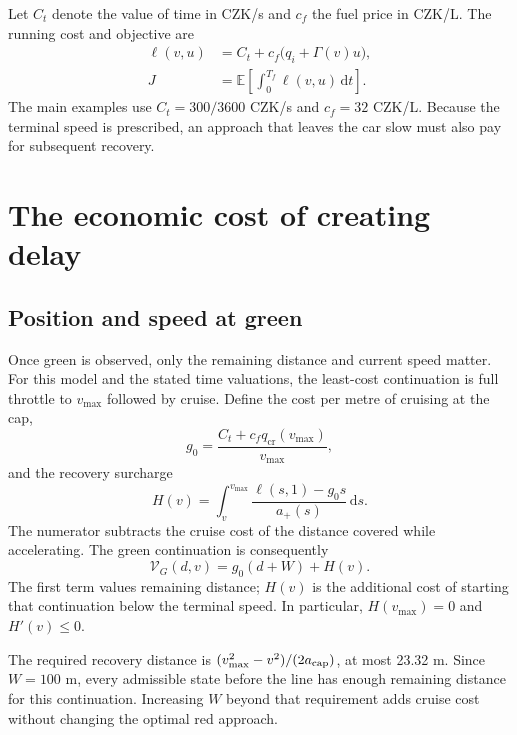 \documentclass[journal,a4paper,twocolumn]{IEEEtran}
\newcommand{\dd}{\,\mathrm{d}}
\newcommand{\cruise}{\mathrm{cr}}
\begin{document}
Let $C_t$ denote the value of time in CZK/s and $c_f$ the fuel price in CZK/L. The running cost and objective are
\begin{align}
 \ell(v,u)&=C_t+c_f\bigl(q_i+\Gamma(v)u\bigr),\label{eq:ell}\\
 J&=\mathbb E\!\left[\int_0^{T_f}\ell(v,u)\dd t\right].
 \label{eq:objective}
\end{align}
The main examples use $C_t=300/3600$ CZK/s and $c_f=32$ CZK/L. Because the terminal speed is prescribed, an approach that leaves the car slow must also pay for subsequent recovery.

\section{The economic cost of creating delay}\label{sec:cost}
\subsection{Position and speed at green}
Once green is observed, only the remaining distance and current speed matter. For this model and the stated time valuations, the least-cost continuation is full throttle to $v_{\max}$ followed by cruise. Define the cost per metre of cruising at the cap,
\begin{equation}
 g_0=\frac{C_t+c_fq_{\cruise}(v_{\max})}{v_{\max}},
\end{equation}
and the recovery surcharge
\begin{equation}
 H(v)=\int_v^{v_{\max}}
 \frac{\ell(s,1)-g_0s}{a_+(s)}\dd s.
 \label{eq:H}
\end{equation}
The numerator subtracts the cruise cost of the distance covered while accelerating. The green continuation is consequently
\begin{equation}
 \boxed{\mathcal V_G(d,v)=g_0(d+W)+H(v).}
 \label{eq:VG}
\end{equation}
The first term values remaining distance; $H(v)$ is the additional cost of starting that continuation below the terminal speed. In particular, $H(v_{\max})=0$ and $H'(v)\le0$.

The required recovery distance is $(v_{\max}^2-v^2)/(2a_{\rm cap})$, at most 23.32 m. Since $W=100$ m, every admissible state before the line has enough remaining distance for this continuation. Increasing $W$ beyond that requirement adds cruise cost without changing the optimal red approach.
\end{document}
